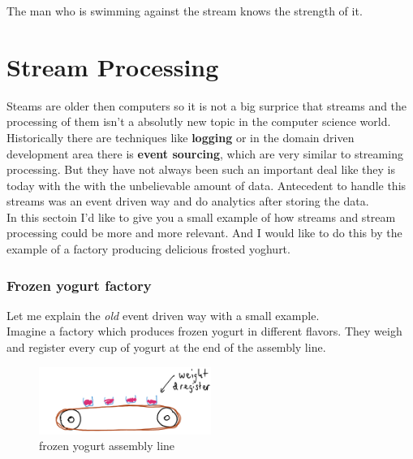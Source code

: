 \begin{savequote}[75mm]
The man who is swimming against the stream knows the strength of it.
\end{savequote}

\chapter{Stream Processing}
Steams are older then computers so it is not a big surprice that streams
and the processing of them isn't a absolutly new topic in the computer science world.
Historically there are techniques like \textbf{logging} or in the domain driven development area there is \textbf{event sourcing},
which are very similar to streaming processing.
But they have not always been such an important deal like they is today with the with the unbelievable amount of data.
Antecedent to handle this streams was an event driven way and do analytics after storing the data.\\

\newpage
{}
In this sectoin I'd like to give you a small example of how streams and stream processing could be more and more
relevant. And I would like to do this by the example of a factory producing delicious frosted yoghurt.

\subsection{Frozen yogurt factory}
Let me explain the \textit{old} event driven way with a small example.\\
Imagine a factory which produces frozen yogurt in different flavors.
They weigh and register every cup of yogurt at the end of the assembly line.\\

\begin{figure}[H]
\centering
\captionsetup{justification=centering}
\includegraphics[width=0.5\textwidth]{images/cups.png}
\caption[Frozen yogurt assembly line]{frozen yogurt assembly line}
\end{figure}

